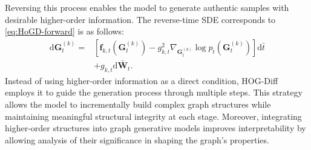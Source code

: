 Reversing this process enables the model to generate authentic samples with desirable higher-order information.
The reverse-time SDE corresponds to \cref{eq:HoGD-forward} is as follows:
\begin{equation}
\begin{split}
    \mathrm{d}\bm{G}_t^{(k)}
     = & \left[\mathbf{f}_{k,t}(\bm{G}_t^{(k)})-g_{k,t}^2\nabla_{\bm{G}_t^{(k)}}\log p_t(\bm{G}_t^{(k)})\right]\mathrm{d}\bar{t} \\
    & +g_{k,t}\mathrm{d}\bar{\bm{W}}_t.
\end{split}
\end{equation}
Instead of using higher-order information as a direct condition, HOG-Diff employs it to guide the generation process through multiple steps. This strategy allows the model to incrementally build complex graph structures while maintaining meaningful structural integrity at each stage.
Moreover, integrating higher-order structures into graph generative models improves interpretability by allowing analysis of their significance in shaping the graph’s properties.







